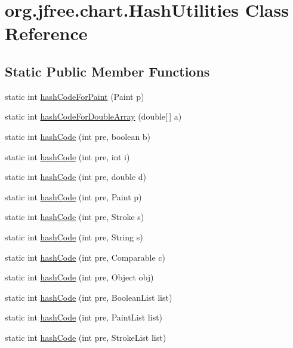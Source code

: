 \hypertarget{classorg_1_1jfree_1_1chart_1_1_hash_utilities}{}\section{org.\+jfree.\+chart.\+Hash\+Utilities Class Reference}
\label{classorg_1_1jfree_1_1chart_1_1_hash_utilities}
\subsection*{Static Public Member Functions}
\begin{DoxyCompactItemize}
\item 
static int \mbox{\hyperlink{classorg_1_1jfree_1_1chart_1_1_hash_utilities_a272dce8293f08de8a41967f97ca1adf1}{hash\+Code\+For\+Paint}} (Paint p)
\item 
static int \mbox{\hyperlink{classorg_1_1jfree_1_1chart_1_1_hash_utilities_ad2742a30adc83df83b996f887b9bf7a3}{hash\+Code\+For\+Double\+Array}} (double\mbox{[}$\,$\mbox{]} a)
\item 
static int \mbox{\hyperlink{classorg_1_1jfree_1_1chart_1_1_hash_utilities_aa24ce901adc9ad33cd04567ea5ffe5a5}{hash\+Code}} (int pre, boolean b)
\item 
static int \mbox{\hyperlink{classorg_1_1jfree_1_1chart_1_1_hash_utilities_ad50b1d78d0086f6908582a1f5ffab09a}{hash\+Code}} (int pre, int i)
\item 
static int \mbox{\hyperlink{classorg_1_1jfree_1_1chart_1_1_hash_utilities_a92e7ba4f47b99af9d134c2984a91e75a}{hash\+Code}} (int pre, double d)
\item 
static int \mbox{\hyperlink{classorg_1_1jfree_1_1chart_1_1_hash_utilities_a7e50a32f19cc06e32d63aa2a73a52dd2}{hash\+Code}} (int pre, Paint p)
\item 
static int \mbox{\hyperlink{classorg_1_1jfree_1_1chart_1_1_hash_utilities_a7cc50195affa5e10dc1b6d4a360b9517}{hash\+Code}} (int pre, Stroke s)
\item 
static int \mbox{\hyperlink{classorg_1_1jfree_1_1chart_1_1_hash_utilities_a6d0e49602b82e6b6b47a85d117ebd178}{hash\+Code}} (int pre, String s)
\item 
static int \mbox{\hyperlink{classorg_1_1jfree_1_1chart_1_1_hash_utilities_a1c0e9a0350bf1436b2637133979fc60e}{hash\+Code}} (int pre, Comparable c)
\item 
static int \mbox{\hyperlink{classorg_1_1jfree_1_1chart_1_1_hash_utilities_a1c8dcc152204db64fb0440a1506fa6da}{hash\+Code}} (int pre, Object obj)
\item 
static int \mbox{\hyperlink{classorg_1_1jfree_1_1chart_1_1_hash_utilities_a64a891c3427c63ae6eddcd835c4951d5}{hash\+Code}} (int pre, Boolean\+List list)
\item 
static int \mbox{\hyperlink{classorg_1_1jfree_1_1chart_1_1_hash_utilities_a575aff69ef23d2879a022f44396c9ad1}{hash\+Code}} (int pre, Paint\+List list)
\item 
static int \mbox{\hyperlink{classorg_1_1jfree_1_1chart_1_1_hash_utilities_a18afb776adb8fcb7ea69dc23a8aff1e4}{hash\+Code}} (int pre, Stroke\+List list)
\end{DoxyCompactItemize}


